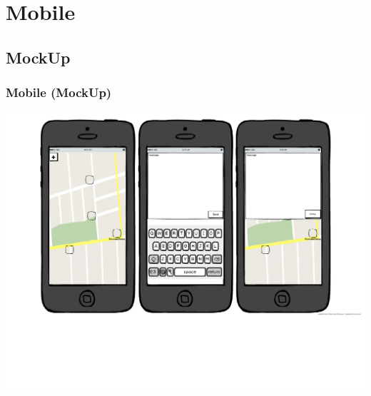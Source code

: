 \documentclass[aspectratio=43]{beamer}
\begin{document}
\section{Mobile}
\subsection{MockUp}
\begin{frame}
	\frametitle{Mobile (MockUp)}
	\includegraphics[width=\textwidth]{ITMobileMockUp.pdf}
\end{frame}
\end{document}
